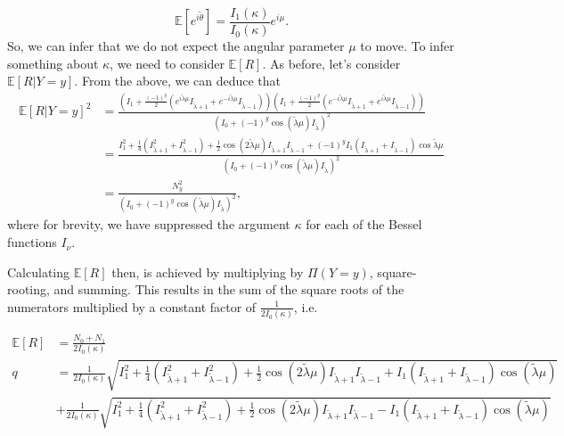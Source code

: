 \documentclass[]{report}
\begin{document}
\[
\mathbb{E}[e^{i \tilde{\theta}}] = \frac{I_{1}(\kappa)}{I_0(\kappa)}e^{i \mu}.
\]
So, we can infer that we do not expect the angular parameter $\mu$ to move. To infer something about $\kappa$, we need to consider $\mathbb{E}[R]$. As before, let's consider $\mathbb{E}[R | Y = y]$. From the above, we can deduce that
 \begin{align*}
	 \mathbb{E}[R | Y = y]^{2} &= \frac{\left( I_1 + \frac{(-1)^{y}}{2}\left( e^{i \tilde{\lambda} \mu}I_{\tilde{\lambda} + 1}+ e^{- i \tilde{\lambda} \mu}I_{\tilde{\lambda} -1} \right)  \right) \left( I_1 + \frac{(-1)^{y}}{2}\left( e^{-i \tilde{\lambda} \mu}I_{\tilde{\lambda} + 1} + e^{i \tilde{\lambda} \mu} I_{\tilde{\lambda} -1 } \right)  \right) }{\left( I_0 + (-1)^{y}\cos(\tilde{\lambda} \mu) I_{\tilde{\lambda}} \right)^{2} } \\
				   &= \frac{I_1^{2} + \frac{1}{4}\left( I_{\tilde{\lambda} + 1}^2 + I_{\tilde{\lambda} - 1}^2 \right) +\frac{1}{2} \cos\left( 2 \tilde{\lambda} \mu \right)  I_{\tilde{\lambda} +1}I_{\tilde{\lambda} - 1} + (-1)^{y} I_1\left( I_{\tilde{\lambda} + 1} + I_{\tilde{\lambda} - 1} \right) \cos \tilde{\lambda} \mu}{\left( I_0 + (-1)^{y}\cos (\tilde{\lambda} \mu) I_{\tilde{\lambda}} \right) ^2} \\
				   &= \frac{N_y^2}{\left( I_0 + (-1)^{y}\cos(\tilde{\lambda} \mu) I_{\tilde{\lambda}} \right) ^2},
\end{align*}
where for brevity, we have suppressed the argument $\kappa$ for each of the Bessel functions $I_{\nu}$.

Calculating $\mathbb{E}[R]$ then, is achieved by multiplying by  $\Pi(Y = y)$, square-rooting, and summing. This results in the sum of the square roots of the numerators multiplied by a constant factor of $\frac{1}{2 I_0(\kappa)}$, i.e.

\begin{align*}
	\mathbb{E}[R] &= \frac{N_0 + N_1}{2 I_0(\kappa)} \\
q		      &= \frac{1}{2 I_0(\kappa) } \sqrt{I_1^2 + \frac{1}{4} \left( I_{\tilde{\lambda} + 1}^{2} + I_{\tilde{\lambda} - 1}^2 \right)  + \frac{1}{2}\cos(2 \tilde{\lambda} \mu) I_{\tilde{\lambda} +1} I_{\tilde{\lambda} - 1} + I_1 \left( I_{\tilde{\lambda} + 1} + I_{\tilde{\lambda} -1 } \right) \cos (\tilde{\lambda} \mu) } \\
		      & + \frac{1}{2 I_0(\kappa) } \sqrt{I_1^2 + \frac{1}{4} \left( I_{\tilde{\lambda} + 1}^{2} + I_{\tilde{\lambda} - 1}^2 \right)  + \frac{1}{2}\cos(2 \tilde{\lambda} \mu) I_{\tilde{\lambda} +1} I_{\tilde{\lambda} - 1} - I_1 \left( I_{\tilde{\lambda} + 1} + I_{\tilde{\lambda} -1 } \right) \cos (\tilde{\lambda} \mu) }
\end{align*}
\end{document}
